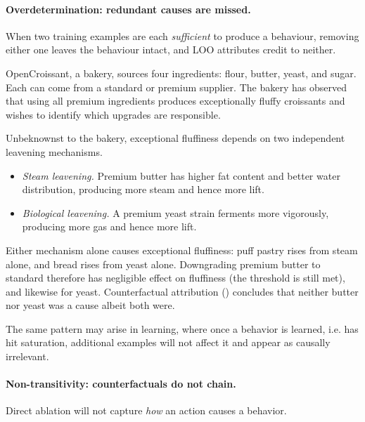 \documentclass[11pt]{article}
\begin{document}
\paragraph{Overdetermination: redundant causes are missed.} When two training examples are each \emph{sufficient} to produce a behaviour, removing either one leaves the behaviour intact, and LOO attributes credit to neither.

\begin{example}\label{ex:croissant}
  OpenCroissant, a bakery, sources four ingredients: flour, butter, yeast, and sugar. Each can come from a standard or premium supplier. The bakery has observed that using all premium ingredients produces exceptionally fluffy croissants and wishes to identify which upgrades are responsible.

  Unbeknownst to the bakery, exceptional fluffiness depends on two independent leavening mechanisms.
  \begin{itemize}
    \item \emph{Steam leavening.} Premium butter has higher fat content and better water distribution, producing more steam and hence more lift.
    \item \emph{Biological leavening.} A premium yeast strain ferments more vigorously, producing more gas and hence more lift.
  \end{itemize}
  Either mechanism alone causes exceptional fluffiness: puff pastry rises from steam alone, and bread rises from yeast alone. Downgrading premium butter to standard therefore has negligible effect on fluffiness (the threshold is still met), and likewise for yeast. Counterfactual attribution () concludes that neither butter nor yeast was a cause albeit both were.
\end{example}

The same pattern may arise in learning, where once a behavior is learned, i.e. has hit saturation, additional examples will not affect it and appear as causally irrelevant.


\paragraph{Non-transitivity: counterfactuals do not chain.} Direct ablation will not capture \emph{how} an action causes a behavior.
\end{document}
